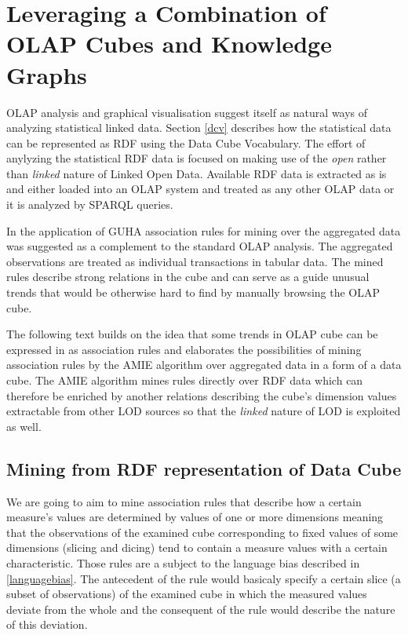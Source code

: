 \chapter{Leveraging a Combination of OLAP Cubes and Knowledge Graphs}

OLAP analysis and graphical visualisation suggest itself as natural ways of analyzing statistical linked data. Section \ref{dcv} describes how the statistical data can be represented as RDF using the Data Cube Vocabulary. The effort of anylyzing the statistical RDF data is focused on making use of the \textit{open} rather than \textit{linked} nature of Linked Open Data. Available RDF data is extracted as is and either loaded into an OLAP system  and treated as any other OLAP data \cite{Kämpgen2011} or it is analyzed by SPARQL queries.\cite{Capadisli2013} 

In \cite{Chudan2015} the application of GUHA \cite{Rauch2017} association rules for mining over the aggregated data was suggested as a complement to the standard OLAP analysis. The aggregated observations are treated as individual transactions in tabular data. The mined rules describe strong relations in the cube and can serve as a guide unusual trends that would be otherwise hard to find by manually browsing the OLAP cube.

The following text builds on the idea that some trends in OLAP cube can be expressed in as association rules and elaborates the possibilities of mining association rules by the AMIE algorithm over aggregated data in a form of a data cube. The AMIE algorithm mines rules directly over RDF data which can therefore be enriched by another relations describing the cube's dimension values extractable from other LOD sources so that the \textit{linked} nature of LOD is exploited as well.

\section{Mining from RDF representation of Data Cube}

We are going to aim to mine association rules that describe how a certain measure's values are determined by values of one or more dimensions meaning that the observations of the examined cube corresponding to fixed values of some dimensions (slicing and dicing) tend to contain a measure values with a certain characteristic. Those rules are a subject to the language bias described in \ref{languagebias}. The antecedent of the rule would basicaly specify a certain slice (a subset of observations) of the examined cube in which the measured values deviate from the whole and the consequent of the rule would describe the nature of this deviation.


